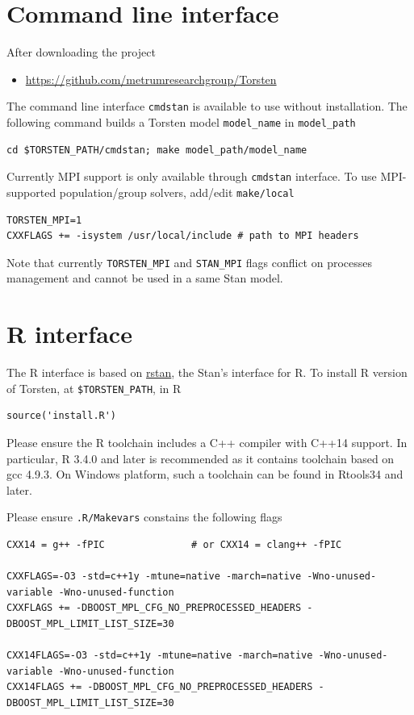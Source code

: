 \documentclass[11pt, reqno, oneside]{amsbook}
\numberwithin{equation}{chapter}
\numberwithin{figure}{chapter}
\numberwithin{table}{chapter}
\theoremstyle{remark}
\begin{document}
\section{Command line interface}
\label{sec:org8c1a5b9}
After downloading the project 

\begin{itemize}
\item \url{https://github.com/metrumresearchgroup/Torsten}
\end{itemize}

The command line interface \texttt{cmdstan} is available to use without
installation. The following command
builds a Torsten model \texttt{model\_name} in \texttt{model\_path}
\begin{verbatim}
cd $TORSTEN_PATH/cmdstan; make model_path/model_name
\end{verbatim}
Currently MPI support is only available through \texttt{cmdstan}
interface. To use MPI-supported population/group solvers,
add/edit \texttt{make/local}
\begin{verbatim}
TORSTEN_MPI=1
CXXFLAGS += -isystem /usr/local/include # path to MPI headers
\end{verbatim}
Note that currently \texttt{TORSTEN\_MPI} and \texttt{STAN\_MPI} flags
conflict on processes management and cannot be used in a
same Stan model.
\section{R interface}
\label{sec:orgac6733d}
The R interface is based on \href{https://cran.r-project.org/web/packages/rstan/index.html}{rstan}, the Stan's interface for
R. To install R version of Torsten, at \texttt{\$TORSTEN\_PATH}, in R
\begin{verbatim}
source('install.R')
\end{verbatim}

Please ensure the R toolchain includes a C++ compiler with
C++14 support. In particular, R 3.4.0 and later is
recommended as it contains toolchain based on gcc 4.9.3. On
Windows platform, such a toolchain can be found in Rtools34 and later.

Please ensure \texttt{.R/Makevars} constains the following flags
\begin{verbatim}
CXX14 = g++ -fPIC               # or CXX14 = clang++ -fPIC

CXXFLAGS=-O3 -std=c++1y -mtune=native -march=native -Wno-unused-variable -Wno-unused-function
CXXFLAGS += -DBOOST_MPL_CFG_NO_PREPROCESSED_HEADERS -DBOOST_MPL_LIMIT_LIST_SIZE=30

CXX14FLAGS=-O3 -std=c++1y -mtune=native -march=native -Wno-unused-variable -Wno-unused-function
CXX14FLAGS += -DBOOST_MPL_CFG_NO_PREPROCESSED_HEADERS -DBOOST_MPL_LIMIT_LIST_SIZE=30
\end{verbatim}
\end{document}

